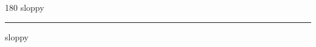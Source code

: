 
\begin{frame}
\begin{center}
\begin{turn}{180}
{\fontsize{2.5cm}{1em}\selectfont sloppy}
\end{turn}
\vspace{1em}\par  
\hrule
\vspace{1em}\par  
{\fontsize{2.5cm}{1em}\selectfont sloppy}
\end{center}
\end{frame}
